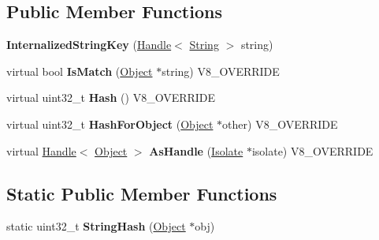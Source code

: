 \subsection*{Public Member Functions}
\begin{DoxyCompactItemize}
\item 
\hypertarget{classv8_1_1internal_1_1_internalized_string_key_aba358506b7265a8c8ac9b75a3d2394aa}{}{\bfseries Internalized\+String\+Key} (\hyperlink{classv8_1_1internal_1_1_handle}{Handle}$<$ \hyperlink{classv8_1_1internal_1_1_string}{String} $>$ string)\label{classv8_1_1internal_1_1_internalized_string_key_aba358506b7265a8c8ac9b75a3d2394aa}

\item 
\hypertarget{classv8_1_1internal_1_1_internalized_string_key_ad0f6202a29f9691c4c508e076bf12863}{}virtual bool {\bfseries Is\+Match} (\hyperlink{classv8_1_1internal_1_1_object}{Object} $\ast$string) V8\+\_\+\+O\+V\+E\+R\+R\+I\+D\+E\label{classv8_1_1internal_1_1_internalized_string_key_ad0f6202a29f9691c4c508e076bf12863}

\item 
\hypertarget{classv8_1_1internal_1_1_internalized_string_key_ad418e552381ac43169c918082b1aad9b}{}virtual uint32\+\_\+t {\bfseries Hash} () V8\+\_\+\+O\+V\+E\+R\+R\+I\+D\+E\label{classv8_1_1internal_1_1_internalized_string_key_ad418e552381ac43169c918082b1aad9b}

\item 
\hypertarget{classv8_1_1internal_1_1_internalized_string_key_a3a4c5c55d1e3958d394d95c5c7fc8970}{}virtual uint32\+\_\+t {\bfseries Hash\+For\+Object} (\hyperlink{classv8_1_1internal_1_1_object}{Object} $\ast$other) V8\+\_\+\+O\+V\+E\+R\+R\+I\+D\+E\label{classv8_1_1internal_1_1_internalized_string_key_a3a4c5c55d1e3958d394d95c5c7fc8970}

\item 
\hypertarget{classv8_1_1internal_1_1_internalized_string_key_a97c5f062b2380322615c862ff691a7b6}{}virtual \hyperlink{classv8_1_1internal_1_1_handle}{Handle}$<$ \hyperlink{classv8_1_1internal_1_1_object}{Object} $>$ {\bfseries As\+Handle} (\hyperlink{classv8_1_1internal_1_1_isolate}{Isolate} $\ast$isolate) V8\+\_\+\+O\+V\+E\+R\+R\+I\+D\+E\label{classv8_1_1internal_1_1_internalized_string_key_a97c5f062b2380322615c862ff691a7b6}

\end{DoxyCompactItemize}
\subsection*{Static Public Member Functions}
\begin{DoxyCompactItemize}
\item 
\hypertarget{classv8_1_1internal_1_1_internalized_string_key_a4164f452dfd9d4682a87f20fbea37be8}{}static uint32\+\_\+t {\bfseries String\+Hash} (\hyperlink{classv8_1_1internal_1_1_object}{Object} $\ast$obj)\label{classv8_1_1internal_1_1_internalized_string_key_a4164f452dfd9d4682a87f20fbea37be8}

\end{DoxyCompactItemize}
